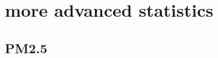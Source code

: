 \documentclass[a4paper,12pt,reqno]{report}
\begin{document}
\section{more advanced statistics}
\label{sec:more advanced statistics}
\subsection{PM2.5}
\end{document}
